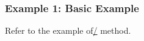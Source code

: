 \subsubsection*{Example 1: Basic Example}

Refer to the example of\hyperref[sect:quotiment]{/} method. 


